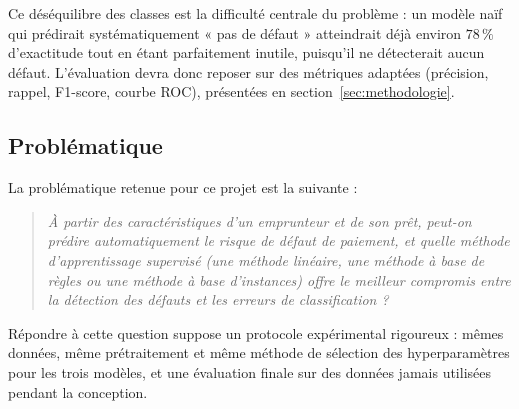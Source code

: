 Ce déséquilibre des classes est la difficulté centrale du problème : un modèle
naïf qui prédirait systématiquement « pas de défaut » atteindrait déjà environ
$78\,\%$ d'exactitude tout en étant parfaitement inutile, puisqu'il ne
détecterait aucun défaut. L'évaluation devra donc reposer sur des métriques
adaptées (précision, rappel, F1-score, courbe ROC), présentées en
section~\ref{sec:methodologie}.

\subsection{Problématique}

La problématique retenue pour ce projet est la suivante :

\begin{quote}
\itshape
À partir des caractéristiques d'un emprunteur et de son prêt, peut-on prédire
automatiquement le risque de défaut de paiement, et quelle méthode
d'apprentissage supervisé (une méthode linéaire, une méthode à base de règles ou
une méthode à base d'instances) offre le meilleur compromis entre la détection
des défauts et les erreurs de classification ?
\end{quote}

Répondre à cette question suppose un protocole expérimental rigoureux : mêmes
données, même prétraitement et même méthode de sélection des hyperparamètres
pour les trois modèles, et une évaluation finale sur des données jamais
utilisées pendant la conception.
